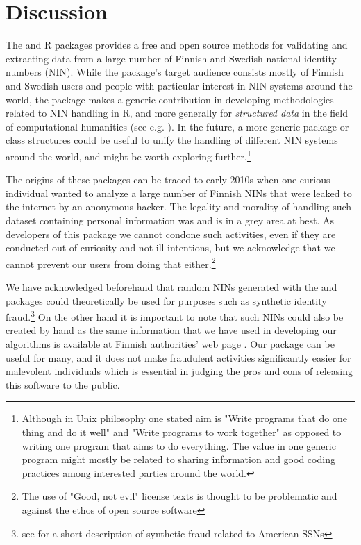 \section{Discussion}

The  and  R packages provides a free and open source methods for validating and extracting data from a large number of Finnish and Swedish national identity numbers (NIN). While the package's target audience consists mostly of Finnish and Swedish users and people with particular interest in NIN systems around the world, the package makes a generic contribution in developing methodologies related to NIN handling in R, and more generally for {\it structured data} in the field of computational humanities (see e.g. \citep{makela2020}). In the future, a more generic package or class structures could be useful to unify the handling of different NIN systems around the world, and might be worth exploring further.\footnote{Although in Unix philosophy one stated aim is "Write programs that do one thing and do it well" and "Write programs to work together" as opposed to writing one program that aims to do everything. The value in one generic program might mostly be related to sharing information and good coding practices among interested parties around the world.}

The origins of these packages can be traced to early 2010s when one curious individual wanted to analyze a large number of Finnish NINs that were leaked to the internet by an anonymous hacker. The legality and morality of handling such dataset containing personal information was and is in a grey area at best. As developers of this package we cannot condone such activities, even if they are conducted out of curiosity and not ill intentions, but we acknowledge that we cannot prevent our users from doing that either.\footnote{The use of "Good, not evil" license texts is thought to be problematic and against the ethos of open source software} 

We have acknowledged beforehand that random NINs generated with the  and  packages could theoretically be used for purposes such as synthetic identity fraud.\footnote{see \citet[32]{brensinger2021} for a short description of synthetic fraud related to American SSNs} On the other hand it is important to note that such NINs could also be created by hand as the same information that we have used in developing our algorithms is available at Finnish authorities' web page \citep{hetudvv}. Our package can be useful for many, and it does not make fraudulent activities significantly easier for malevolent individuals which is essential in judging the pros and cons of releasing this software to the public.

